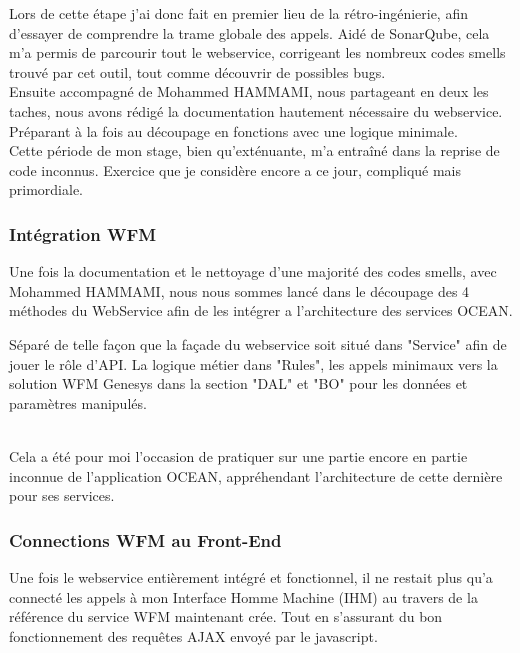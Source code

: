 \documentclass{rapport}
\begin{document}
Lors de cette étape j'ai donc fait en premier lieu de la rétro-ingénierie, afin d'essayer de comprendre la trame globale des appels. Aidé de SonarQube, cela m'a permis de parcourir tout le webservice, corrigeant les nombreux codes smells trouvé par cet outil, tout comme découvrir de possibles bugs.\\
Ensuite accompagné de Mohammed HAMMAMI, nous partageant en deux les taches, nous avons rédigé la documentation hautement nécessaire du webservice. Préparant à la fois au découpage en fonctions avec une logique minimale.\\

Cette période de mon stage, bien qu'exténuante, m'a entraîné dans la reprise de code inconnus. Exercice que je considère encore a ce jour, compliqué mais primordiale.

\subsubsection{Intégration WFM}

Une fois la documentation et le nettoyage d'une majorité des codes smells, avec Mohammed HAMMAMI, nous nous sommes lancé dans le découpage des 4 méthodes du WebService afin de les intégrer a l'architecture des services OCEAN. 

\begin{minipage}{0.35\textwidth}
\end{minipage}
\begin{minipage}{0.55\textwidth}
Séparé de telle façon que la façade du webservice soit situé dans "Service" afin de jouer le rôle d'API. La logique métier dans "Rules", les appels minimaux vers la solution WFM Genesys dans la section "DAL" et "BO" pour les données et paramètres manipulés.
\end{minipage}
\vspace{5mm} %
\\

Cela a été pour moi l'occasion de pratiquer sur une partie encore en partie inconnue de l'application OCEAN, appréhendant l'architecture de cette dernière pour ses services.

\subsubsection{Connections WFM au Front-End}

Une fois le webservice entièrement intégré et fonctionnel, il ne restait plus qu'a connecté les appels à mon Interface Homme Machine (IHM) au travers de la référence du service WFM maintenant crée. Tout en s'assurant du bon fonctionnement des requêtes AJAX envoyé par le javascript.\\
\end{document}
